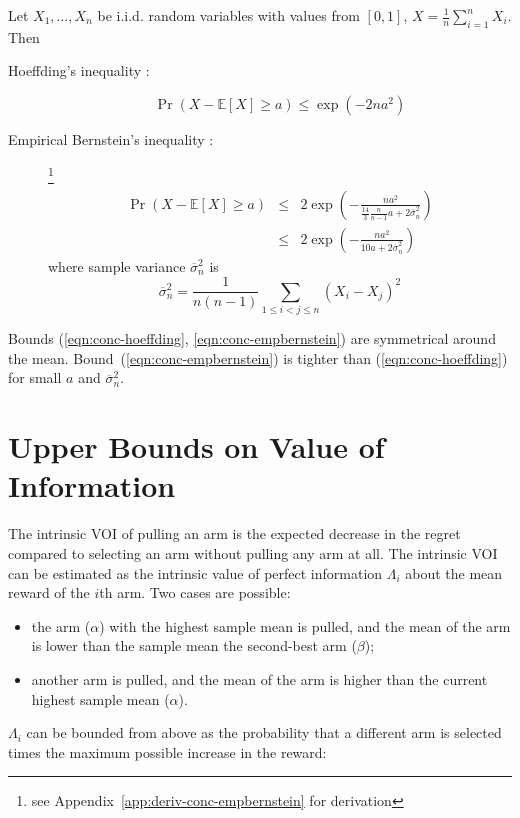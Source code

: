 \documentclass{article}
\newcommand {\IE} {\ensuremath {\mathbb{E}}}
\begin{document}
Let $X_1, \ldots, X_n$ be i.i.d. random variables with values from $[0,1]$,
$X=\frac 1 n \sum_{i=1}^n X_i$. Then 
\begin{description}
\item[Hoeffding's inequality \rm{\cite{Hoeffding.ineq}}:] 
\begin{equation}
\Pr(X-\IE[X] \ge a) \le \exp ( -2na^2)
\label{eqn:conc-hoeffding}
\end{equation}
\item[Empirical Bernstein's inequality
  \rm{\cite{MaurerPontil.benrstein}}:]\footnote{see
    Appendix~\ref{app:deriv-conc-empbernstein} for derivation}
\begin{eqnarray}
\Pr(X-\IE[X] \ge a) &\le& 2\exp \left( - \frac {na^2} {\frac {14} {3}
                          \frac {n} {n-1}a+2\overline\sigma_n^2}\right)\nonumber\\
                    &\le& 2\exp \left( - \frac {na^2} {10a+2\overline\sigma_n^2}\right)
\label{eqn:conc-empbernstein}
\end{eqnarray}
where sample variance $\overline\sigma_n^2$ is
\begin{equation}
\overline\sigma_n^2=\frac 1 {n(n-1)} \sum_{1\le i < j\le n}(X_i-X_j)^2
\label{eqn:sample-variance}
\end{equation}
\end{description}
Bounds (\ref{eqn:conc-hoeffding}, \ref{eqn:conc-empbernstein}) are symmetrical
around the mean. Bound~(\ref{eqn:conc-empbernstein}) is tighter than
(\ref{eqn:conc-hoeffding}) for small $a$ and $\overline\sigma_n^2$. 

\section{Upper Bounds on Value of Information}

The intrinsic VOI of pulling an arm is the expected decrease
in the regret compared to selecting an arm without pulling any arm at
all. The intrinsic VOI can be estimated as the intrinsic 
value of perfect information $\Lambda_i$ about the mean reward of the $i$th arm. Two
cases are possible:
\begin{itemize}
\item the arm ($\alpha$) with the highest sample mean is pulled, and the 
mean of the arm is lower than the sample mean the second-best arm ($\beta$);
\item another arm is pulled, and the mean of the arm is higher
than the current highest sample mean ($\alpha$).
\end{itemize}
$\Lambda_i$ can be bounded from above as the probability that a different arm is selected times the
maximum possible increase in the reward:
\end{document}
